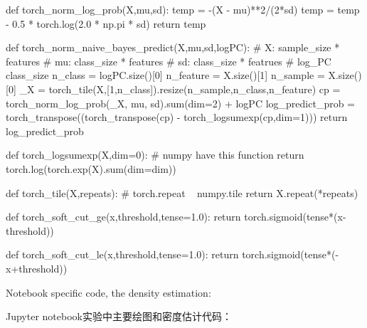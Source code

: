 \documentclass{sicnuthesis}
\begin{document}
\begin{python}
def torch_norm_log_prob(X,mu,sd):    
    temp = -(X - mu)**2/(2*sd) 
    temp = temp - 0.5 * torch.log(2.0 * np.pi * sd)
    return temp

def torch_norm_naive_bayes_predict(X,mu,sd,logPC):
    # X: sample_size * features
    # mu: class_size * features
    # sd: class_size * featrues
    # log_PC class_size
    n_class = logPC.size()[0]
    n_feature = X.size()[1]
    n_sample = X.size()[0]
    _X = torch_tile(X,[1,n_class]).resize(n_sample,n_class,n_feature)
    cp = torch_norm_log_prob(_X, mu, sd).sum(dim=2) + logPC  
    log_predict_prob = torch_transpose((torch_transpose(cp) - torch_logsumexp(cp,dim=1)))
    return log_predict_prob
    
def torch_logsumexp(X,dim=0):
    # numpy have this function
    return torch.log(torch.exp(X).sum(dim=dim))

def torch_tile(X,repeats):
    # torch.repeat ~ numpy.tile
    return X.repeat(*repeats)


def torch_soft_cut_ge(x,threshold,tense=1.0):
    return torch.sigmoid(tense*(x-threshold))

def torch_soft_cut_le(x,threshold,tense=1.0):
    return torch.sigmoid(tense*(-x+threshold))


\end{python}

Notebook specific code, the density estimation:

Jupyter notebook实验中主要绘图和密度估计代码：
\end{document}
